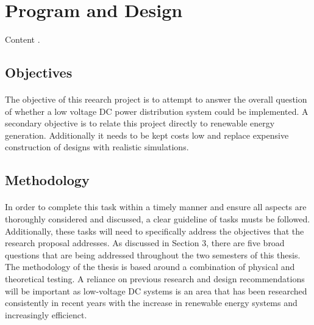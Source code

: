 \section{Program and Design}

Content   \cite{Pellis1997}.  


\subsection{Objectives}

\paragraph{}
The objective of this reearch project is to attempt to answer the overall question of whether a low voltage DC power distribution system could be implemented. A secondary objective is to relate this project directly to renewable energy generation. Additionally it needs to be kept costs low and replace expensive construction of designs with realistic simulations. 

\subsection{Methodology}

\paragraph{}
In order to complete this task within a timely manner and ensure all aspects are thoroughly considered and discussed, a clear guideline of tasks musts be followed. Additionally, these tasks will need to specifically address the objectives that the research proposal addresses. As discussed in Section 3, there are five broad questions that are being addressed throughout the two semesters of this thesis. The methodology of the thesis is based around a combination of physical and theoretical testing. A reliance on previous research and design recommendations will be important as low-voltage DC systems is an area that has been researched consistently in recent years with the increase in renewable energy systems and increasingly efficienct. 


